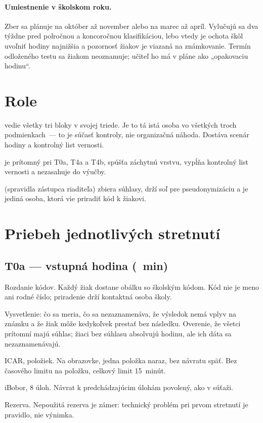 \paragraph{Umiestnenie v školskom roku.} Zber sa plánuje na október až november alebo na marec až apríl. Vylučujú sa dva týždne pred polročnou a koncoročnou klasifikáciou, lebo vtedy je ochota škôl uvoľniť hodiny najnižšia a pozornosť žiakov je viazaná na známkovanie. Termín odloženého testu sa žiakom neoznamuje; učiteľ ho má v pláne ako „opakovaciu hodinu“.

\section{Role}

\begin{description}[leftmargin=0.6cm, nosep]
    \item[\textbf{Učiteľ}] vedie všetky tri bloky v svojej triede. Je to tá istá osoba vo všetkých troch podmienkach~--- to je súčasť kontroly, nie organizačná náhoda. Dostáva scenár hodiny a kontrolný list vernosti.
    \item[\textbf{Výskumník}] je prítomný pri T0a, T4a a T4b, spúšťa záchytnú vrstvu, vypĺňa kontrolný list vernosti a nezasahuje do výučby.
    \item[\textbf{Kontaktná osoba školy}] (spravidla zástupca riaditeľa) zbiera súhlasy, drží soľ pre pseudonymizáciu a je jediná osoba, ktorá vie priradiť kód k žiakovi.
\end{description}

\section{Priebeh jednotlivých stretnutí}

\subsection*{T0a --- vstupná hodina (\mplBudgetToa~min)}

\begin{description}[leftmargin=1.5cm, style=nextline, nosep]
    \item[0--5 min] Rozdanie kódov. Každý žiak dostane obálku so školským kódom. Kód nie je meno ani rodné číslo; priradenie drží kontaktná osoba školy.
    \item[5--8 min] Vysvetlenie: čo sa meria, čo sa nezaznamenáva, že výsledok nemá vplyv na známku a že žiak môže kedykoľvek prestať bez následku. Overenie, že všetci prítomní majú súhlas; žiaci bez súhlasu absolvujú hodinu, ale ich dáta sa nezaznamenávajú.
    \item[8--23 min] ICAR, \mplGfItems{} položiek. Na obrazovke, jedna položka naraz, bez návratu späť. Bez časového limitu na položku, celkový limit 15~minút.
    \item[23--36 min] iBobor, 8 úloh. Návrat k predchádzajúcim úlohám povolený, ako v súťaži.
    \item[36--45 min] Rezerva. Nepoužitá rezerva je zámer: technický problém pri prvom stretnutí je pravidlo, nie výnimka.
\end{description}

